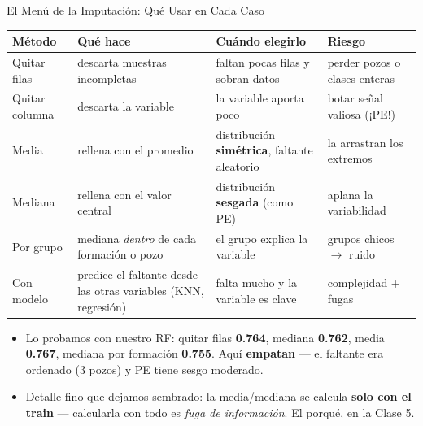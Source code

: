 \documentclass[aspectratio=169, 11pt]{beamer}
\begin{document}
\begin{frame}[shrink=14]{El Menú de la Imputación: Qué Usar en Cada Caso}
  \vspace{-4pt}
  {\footnotesize
  \begin{tabular}{@{}lp{4.2cm}p{4.6cm}p{3.4cm}@{}}
    \toprule
    {\color{arcaDark}\bfseries Método} & {\color{arcaDark}\bfseries Qué hace} &
    {\color{arcaDark}\bfseries Cuándo elegirlo} & {\color{arcaDark}\bfseries Riesgo} \\
    \midrule
    Quitar filas & descarta muestras incompletas & faltan pocas filas y sobran datos
      & perder pozos o clases enteras \\
    Quitar columna & descarta la variable & la variable aporta poco
      & botar señal valiosa (¡PE!) \\
    Media & rellena con el promedio & distribución \textbf{simétrica}, faltante aleatorio
      & la arrastran los extremos \\
    Mediana & rellena con el valor central & distribución \textbf{sesgada} (como PE)
      & aplana la variabilidad \\
    Por grupo & mediana \emph{dentro} de cada formación o pozo & el grupo explica
      la variable & grupos chicos \(\to\) ruido \\
    Con modelo & predice el faltante desde las otras variables (KNN, regresión)
      & falta mucho y la variable es clave & complejidad + fugas \\
    \bottomrule
  \end{tabular}
  }

  \vspace{8pt}
  {\footnotesize\color{textMuted}
  \begin{itemize}\setlength{\itemsep}{3pt}
    \item[{\color{codeGreen}\scriptsize\faCheck}]
      Lo probamos con nuestro RF: quitar filas \textbf{0.764}, mediana \textbf{0.762},
      media \textbf{0.767}, mediana por formación \textbf{0.755}. Aquí \textbf{empatan} ---
      el faltante era ordenado (3 pozos) y PE tiene sesgo moderado.
    \item[{\color{arcaRed}\scriptsize\faExclamationTriangle}]
      Detalle fino que dejamos sembrado: la media/mediana se calcula
      \textbf{solo con el train} --- calcularla con todo es \emph{fuga de información}.
      El porqué, en la Clase 5.
  \end{itemize}
  }
\end{frame}
\end{document}
